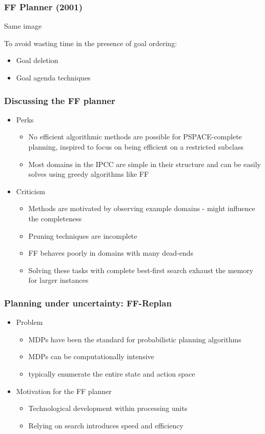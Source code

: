 \documentclass{beamer}
\let\origframetitle=\frametitle
\renewcommand\frametitle[1]{\origframetitle{\textbf{\large{\textrm{#1}}}}}
\begin{document}
\begin{frame}
  \frametitle{FF Planner (2001)}
    Same image

  To avoid wasting time in the presence of goal ordering:

  \begin{itemize}
    \item Goal deletion
    \item Goal agenda techniques
  \end{itemize}

\end{frame}

\begin{frame}
  \frametitle{Discussing the FF planner}

\begin{itemize}
\item  Perks
  \begin{itemize}
    \item No efficient algorithmic methods are possible for PSPACE-complete planning, inspired to focus on being efficient on a restricted subclass
    \item Most domains in the IPCC are simple in their structure and can be easily solves using greedy algorithms like FF
  \end{itemize}
\item Criticism
  \begin{itemize}
    \item Methods are motivated by observing example domains - might influence the completeness
    \item Pruning techniques are incomplete
    \item FF behaves poorly in domains with many dead-ends
    \item Solving these tasks with complete best-first search exhaust the memory for larger instances
  \end{itemize}
\end{itemize}
\end{frame}


\begin{frame}
  \frametitle{Planning under uncertainty: FF-Replan}

  \begin{itemize}
    \item Problem
      \begin{itemize}
        \item MDPs have been the standard for probabilistic planning algorithms
        \item MDPs can be computationally intensive
        \item typically enumerate the entire state and action space
      \end{itemize}
    \item Motivation for the FF planner
      \begin{itemize}
        \item Technological development within processing units
        \item Relying on search introduces speed and efficiency
      \end{itemize}
  \end{itemize}
\end{frame}
\end{document}
